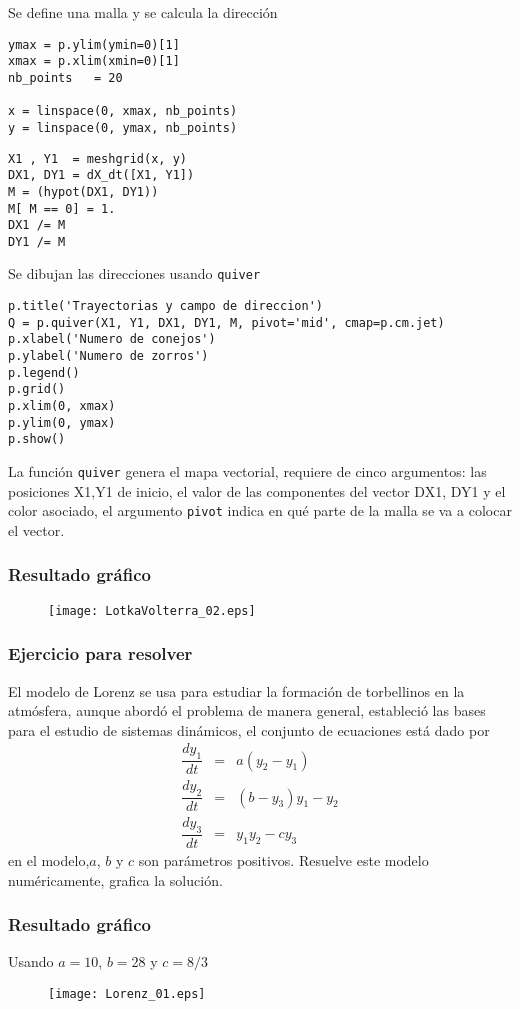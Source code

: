 \begin{frame}[fragile]
Se define una malla y se calcula la direcci\'{o}n
\begin{lstlisting}
ymax = p.ylim(ymin=0)[1]                        
xmax = p.xlim(xmin=0)[1]
nb_points   = 20
 
x = linspace(0, xmax, nb_points)
y = linspace(0, ymax, nb_points)
\end{lstlisting}
\end{frame}
\begin{frame}[fragile]
\begin{lstlisting}
X1 , Y1  = meshgrid(x, y)                       
DX1, DY1 = dX_dt([X1, Y1])                      
M = (hypot(DX1, DY1))                           
M[ M == 0] = 1.                                 
DX1 /= M                                        
DY1 /= M
\end{lstlisting}
\end{frame}
\begin{frame}[fragile]
Se dibujan las direcciones usando \texttt{quiver}
\begin{lstlisting}
p.title('Trayectorias y campo de direccion')
Q = p.quiver(X1, Y1, DX1, DY1, M, pivot='mid', cmap=p.cm.jet)
p.xlabel('Numero de conejos')
p.ylabel('Numero de zorros')
p.legend()
p.grid()
p.xlim(0, xmax)
p.ylim(0, ymax)
p.show()
\end{lstlisting}
La funci\'{o}n \texttt{quiver} genera el mapa vectorial, requiere de cinco argumentos: las posiciones X1,Y1 de inicio, el valor de las componentes del vector DX1, DY1 y el color asociado, el argumento \texttt{pivot} indica en qu\'{e} parte de la malla se va a colocar el vector.
\end{frame}
\begin{frame}
\frametitle{Resultado gr\'{a}fico}
\begin{figure}
	\centering
	\texttt{[image: LotkaVolterra\_02.eps]} 
\end{figure}
\end{frame}
\begin{frame}
\frametitle{Ejercicio para resolver}
El modelo de Lorenz se usa para estudiar la formaci\'{o}n de torbellinos en la atm\'{o}sfera, aunque abord\'{o} el problema de manera general, estableci\'{o} las bases para el estudio de sistemas din\'{a}micos, el conjunto de ecuaciones est\'{a} dado por
\begin{eqnarray*}
\dfrac{dy_{1}}{dt} &=& a(y_{2}-y_{1}) \\
\dfrac{dy_{2}}{dt} &=& (b - y_{3})y_{1} - y_{2} \\
\dfrac{dy_{3}}{dt} &=& y_{1}y_{2} - cy_{3}
\end{eqnarray*}
en el modelo,$a$, $b$ y $c$ son par\'{a}metros positivos. Resuelve este modelo num\'{e}ricamente, grafica la soluci\'{o}n.
\end{frame}
\begin{frame}
\frametitle{Resultado gr\'{a}fico}
Usando $a = 10$, $b= 28$ y $c=8/3$
\begin{figure}
	\centering
	\texttt{[image: Lorenz\_01.eps]} 
\end{figure}
\end{frame}
